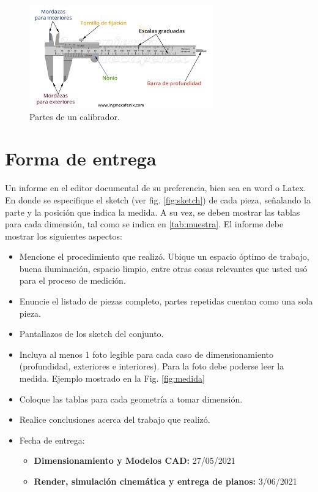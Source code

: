 \documentclass[letterpaper,pdftex]{article}
\begin{document}
\begin{figure}
\begin{center}
\includegraphics[scale=0.7]{calibrador.jpeg}
\caption{Partes de un calibrador.}
\label{fig:calibrador}
\end{center}
\end{figure}

\section{Forma de entrega}

Un informe en el editor documental de su preferencia, bien sea en word o Latex. En donde se especifique el sketch (ver fig. \ref{fig:sketch}) de cada pieza, señalando la parte y la posición que indica la medida. A su vez, se deben mostrar las tablas para cada dimensión, tal como se indica en \ref{tab:muestra}. El informe debe mostrar los siguientes aspectos:

\begin{itemize}
\item Mencione el procedimiento que realizó. Ubique un espacio óptimo de trabajo, buena iluminación, espacio limpio, entre otras cosas relevantes que usted usó para el proceso de medición.
\item Enuncie el listado de piezas completo, partes repetidas cuentan como una sola pieza.
\item Pantallazos de los sketch del conjunto.
\item Incluya al menos 1 foto legible para cada caso de dimensionamiento (profundidad, exteriores e interiores). Para la foto debe poderse leer la medida. Ejemplo mostrado en la Fig. \ref{fig:medida}
\item Coloque las tablas para cada geometría a tomar dimensión.
\item Realice conclusiones acerca del trabajo que realizó.
\item Fecha de entrega: 
\begin{itemize}
\item \textbf{Dimensionamiento y Modelos CAD:} 27/05/2021
\item \textbf{Render, simulación cinemática y entrega de planos:} 3/06/2021 
\end{itemize}
\end{itemize}
\end{document}

